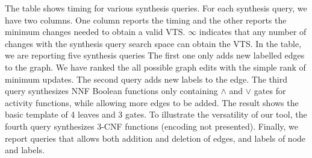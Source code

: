The table shows timing for various synthesis queries.
%
For each synthesis query, we have two columns.
%
One column reports the timing and the other reports the minimum changes
needed to obtain a valid VTS.
%
$\infty$ indicates that any number of changes with the synthesis query
search space can obtain the VTS.
%
In the table, we are reporting five synthesis queries
%
The first one only adds new labelled edges to the graph.
%
We have ranked the all possible graph edits with the simple rank of
minimum updates.
%
The second query adds new labels to the edge.
%
The third query synthesizes NNF Boolean functions only containing
$\land$ and $\lor$ gates for activity functions, while allowing
more edges to be added.
%
The result shows the basic template of 4 leaves and 3 gates.
%
%
To illustrate the versatility of our tool, the fourth query
synthesizes $3$-CNF functions (encoding not presented).
%
Finally, we report queries that allows both addition and deletion of edges, and labels
of node and labels. 

%
%

